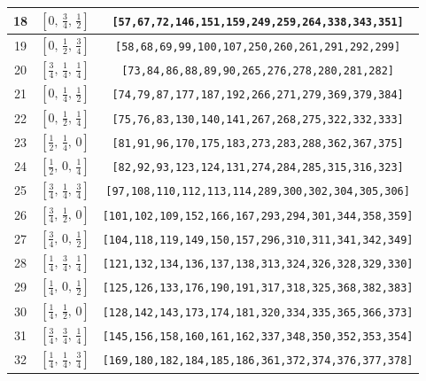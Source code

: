 \documentclass[fleqn,8pt]{jsarticle}
\begin{document}
\begin{longtable}{ccc}
18 & $\left[ 0,\, \frac{3}{4},\, \frac{1}{2} \right]$ & {\tt [57,67,72,146,151,159,249,259,264,338,343,351]} \\ \hline
19 & $\left[ 0,\, \frac{1}{2},\, \frac{3}{4} \right]$ & {\tt [58,68,69,99,100,107,250,260,261,291,292,299]} \\ \hline
20 & $\left[ \frac{3}{4},\, \frac{1}{4},\, \frac{1}{4} \right]$ & {\tt [73,84,86,88,89,90,265,276,278,280,281,282]} \\ \hline
21 & $\left[ 0,\, \frac{1}{4},\, \frac{1}{2} \right]$ & {\tt [74,79,87,177,187,192,266,271,279,369,379,384]} \\ \hline
22 & $\left[ 0,\, \frac{1}{2},\, \frac{1}{4} \right]$ & {\tt [75,76,83,130,140,141,267,268,275,322,332,333]} \\ \hline
23 & $\left[ \frac{1}{2},\, \frac{1}{4},\, 0 \right]$ & {\tt [81,91,96,170,175,183,273,283,288,362,367,375]} \\ \hline
24 & $\left[ \frac{1}{2},\, 0,\, \frac{1}{4} \right]$ & {\tt [82,92,93,123,124,131,274,284,285,315,316,323]} \\ \hline
25 & $\left[ \frac{3}{4},\, \frac{1}{4},\, \frac{3}{4} \right]$ & {\tt [97,108,110,112,113,114,289,300,302,304,305,306]} \\ \hline
26 & $\left[ \frac{3}{4},\, \frac{1}{2},\, 0 \right]$ & {\tt [101,102,109,152,166,167,293,294,301,344,358,359]} \\ \hline
27 & $\left[ \frac{3}{4},\, 0,\, \frac{1}{2} \right]$ & {\tt [104,118,119,149,150,157,296,310,311,341,342,349]} \\ \hline
28 & $\left[ \frac{1}{4},\, \frac{3}{4},\, \frac{1}{4} \right]$ & {\tt [121,132,134,136,137,138,313,324,326,328,329,330]} \\ \hline
29 & $\left[ \frac{1}{4},\, 0,\, \frac{1}{2} \right]$ & {\tt [125,126,133,176,190,191,317,318,325,368,382,383]} \\ \hline
30 & $\left[ \frac{1}{4},\, \frac{1}{2},\, 0 \right]$ & {\tt [128,142,143,173,174,181,320,334,335,365,366,373]} \\ \hline
31 & $\left[ \frac{3}{4},\, \frac{3}{4},\, \frac{1}{4} \right]$ & {\tt [145,156,158,160,161,162,337,348,350,352,353,354]} \\ \hline
32 & $\left[ \frac{1}{4},\, \frac{1}{4},\, \frac{3}{4} \right]$ & {\tt [169,180,182,184,185,186,361,372,374,376,377,378]} \\
\end{longtable}
\renewcommand{\arraystretch}{1.2}
\end{document}
